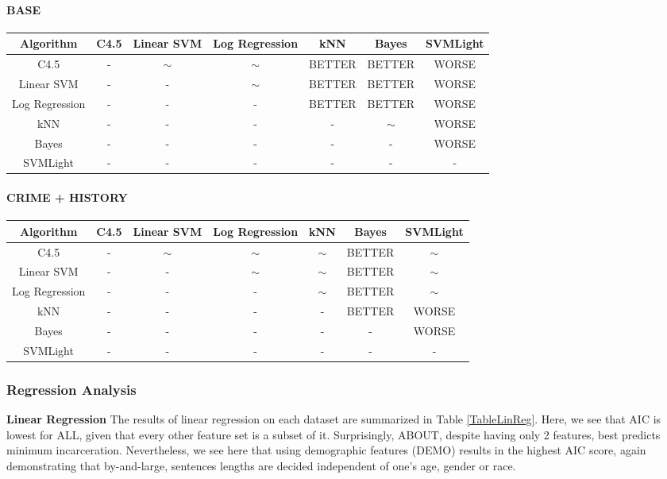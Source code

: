 \documentclass[11pt,letter]{article}
\begin{document}
\paragraph{BASE} \quad

\begin{tabular}{|c|c|c|c|c|c|c|}
\hline
Algorithm & C4.5  & Linear SVM & Log Regression & kNN  & Bayes & SVMLight \\
\hline
C4.5 	& -		& $\sim$	& $\sim$	& BETTER	& BETTER	& WORSE		\\
Linear SVM		& -		& -			& $\sim$	& BETTER	& BETTER	& WORSE		\\
Log Regression	& -		& -			& -			& BETTER	& BETTER	& WORSE 	\\
kNN 		& -		& -			& -			& -			& $\sim$	& WORSE		\\
Bayes			& -		& -			& -			& -			& -			& WORSE		\\
SVMLight & - & - & - & - & - & - \\
\hline
\end{tabular}

\paragraph{CRIME + HISTORY} \quad

\begin{tabular}{|c|c|c|c|c|c|c|}
\hline
Algorithm & C4.5  & Linear SVM & Log Regression & kNN  & Bayes & SVMLight \\
\hline
C4.5 	& -		& $\sim$	& $\sim$	& $\sim$	& BETTER	& $\sim$		\\
Linear SVM		& -		& -			& $\sim$	& $\sim$	& BETTER	& $\sim$		\\
Log Regression	& -		& -			& -			& $\sim$	& BETTER	& $\sim$ 	\\
kNN 		& -		& -			& -			& -			& BETTER	& WORSE		\\
Bayes			& -		& -			& -			& -			& -			& WORSE		\\
SVMLight & - & - & - & - & - & - \\
\hline
\end{tabular}


\subsubsection{Regression Analysis}

\textbf{Linear Regression}
The results of linear regression on each dataset are summarized in Table \ref{TableLinReg}. Here, we see that AIC is lowest for ALL, given that every other feature set is a subset of it. Surprisingly, ABOUT, despite having only 2 features, best predicts minimum incarceration. Nevertheless, we see here that using demographic features (DEMO) results in the highest AIC score, again demonstrating that by-and-large, sentences lengths are decided independent of one's age, gender or race.
\end{document}
